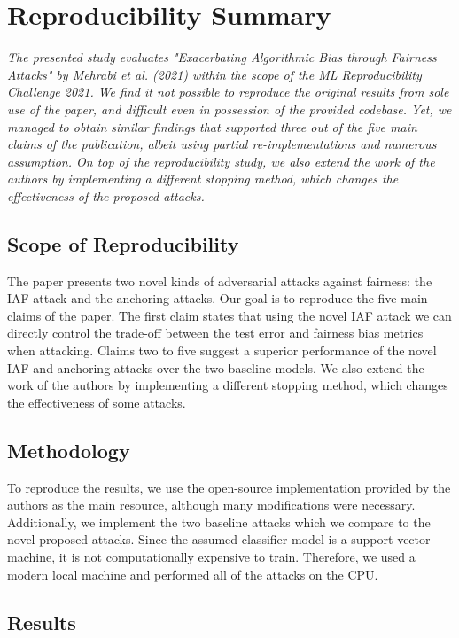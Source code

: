 \section*{\centering Reproducibility Summary}

\textit{The presented study evaluates "Exacerbating Algorithmic Bias through Fairness Attacks" by Mehrabi et al. (2021) within the scope of the ML Reproducibility Challenge 2021. We find it not possible to reproduce the original results from sole use of the paper, and difficult even in possession of the provided codebase. Yet, we managed to obtain similar findings that supported three out of the five main claims of the publication, albeit using partial re-implementations and numerous assumption. On top of the reproducibility study, we also extend the work of the authors by implementing a different stopping method, which changes the effectiveness of the proposed attacks.}

\subsection*{Scope of Reproducibility}

The paper presents two novel kinds of adversarial attacks against fairness: the IAF attack and the anchoring attacks. Our goal is to reproduce the five main claims of the paper. The first claim states that using the novel IAF attack we can directly control the trade-off between the test error and fairness bias metrics when attacking. Claims two to five suggest a superior performance of the novel IAF and anchoring attacks over the two baseline models. We also extend the work of the authors by implementing a different stopping method, which changes the effectiveness of some attacks. 

\subsection*{Methodology}

To reproduce the results, we use the open-source implementation provided by the authors as the main resource, although many modifications were necessary. Additionally, we implement the two baseline attacks which we compare to the novel proposed attacks. Since the assumed classifier model is a support vector machine, it is not computationally expensive to train. Therefore, we used a modern local machine and performed all of the attacks on the CPU. 

\subsection*{Results}

